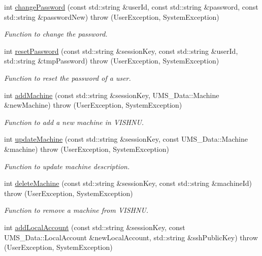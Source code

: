\begin{DoxyCompactItemize}
int \hyperlink{namespacevishnu_a24ec95c164ce8905b8eccf98e9bb633e}{changePassword} (const std::string \&userId, const std::string \&password, const std::string \&passwordNew)  throw (UserException, SystemException)
\begin{DoxyCompactList}\small\item\em Function to change the password. \item\end{DoxyCompactList}\item 
int \hyperlink{namespacevishnu_a11f16b7501b8814c491d13431409051c}{resetPassword} (const std::string \&sessionKey, const std::string \&userId, std::string \&tmpPassword)  throw (UserException, SystemException)
\begin{DoxyCompactList}\small\item\em Function to reset the password of a user. \item\end{DoxyCompactList}\item 
int \hyperlink{namespacevishnu_aca4f5c2716ce1dd8ddc15a2554c95004}{addMachine} (const std::string \&sessionKey, UMS\_\-Data::Machine \&newMachine)  throw (UserException, SystemException)
\begin{DoxyCompactList}\small\item\em Function to add a new machine in VISHNU. \item\end{DoxyCompactList}\item 
int \hyperlink{namespacevishnu_a1f8fe4e8fa5956be1f264e9a5f78c9f1}{updateMachine} (const std::string \&sessionKey, const UMS\_\-Data::Machine \&machine)  throw (UserException, SystemException)
\begin{DoxyCompactList}\small\item\em Function to update machine description. \item\end{DoxyCompactList}\item 
int \hyperlink{namespacevishnu_abdd14f47db308fc03655149ac7d93199}{deleteMachine} (const std::string \&sessionKey, const std::string \&machineId)  throw (UserException, SystemException)
\begin{DoxyCompactList}\small\item\em Function to remove a machine from VISHNU. \item\end{DoxyCompactList}\item 
int \hyperlink{namespacevishnu_ab54431ee8c1616ae24b071e9146d39e9}{addLocalAccount} (const std::string \&sessionKey, const UMS\_\-Data::LocalAccount \&newLocalAccount, std::string \&sshPublicKey)  throw (UserException, SystemException)

\end{DoxyCompactItemize}
